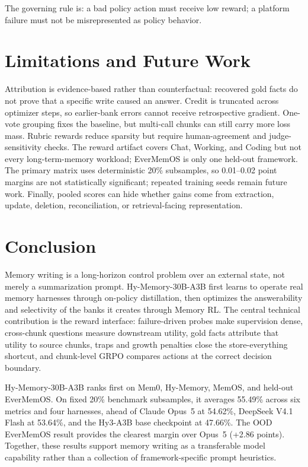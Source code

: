 \documentclass{article}
\begin{document}
The governing rule is: a bad policy action must receive low reward; a platform failure must not be misrepresented as policy behavior.

\section{Limitations and Future Work}

Attribution is evidence-based rather than counterfactual: recovered gold facts do not prove that a specific write caused an answer. Credit is truncated across optimizer steps, so earlier-bank errors cannot receive retrospective gradient. One-vote grouping fixes the baseline, but multi-call chunks can still carry more loss mass. Rubric rewards reduce sparsity but require human-agreement and judge-sensitivity checks. The reward artifact covers Chat, Working, and Coding but not every long-term-memory workload; EverMemOS is only one held-out framework. The primary matrix uses deterministic 20\% subsamples, so 0.01--0.02 point margins are not statistically significant; repeated training seeds remain future work. Finally, pooled scores can hide whether gains come from extraction, update, deletion, reconciliation, or retrieval-facing representation.

\section{Conclusion}

Memory writing is a long-horizon control problem over an external state, not merely a summarization prompt. Hy-Memory-30B-A3B first learns to operate real memory harnesses through on-policy distillation, then optimizes the answerability and selectivity of the banks it creates through Memory RL. The central technical contribution is the reward interface: failure-driven probes make supervision dense, cross-chunk questions measure downstream utility, gold facts attribute that utility to source chunks, traps and growth penalties close the store-everything shortcut, and chunk-level GRPO compares actions at the correct decision boundary.

Hy-Memory-30B-A3B ranks first on Mem0, Hy-Memory, MemOS, and held-out EverMemOS. On fixed 20\% benchmark subsamples, it averages 55.49\% across six metrics and four harnesses, ahead of Claude Opus~5 at 54.62\%, DeepSeek V4.1 Flash at 53.64\%, and the Hy3-A3B base checkpoint at 47.66\%. The OOD EverMemOS result provides the clearest margin over Opus~5 (+2.86 points). Together, these results support memory writing as a transferable model capability rather than a collection of framework-specific prompt heuristics.
\end{document}

